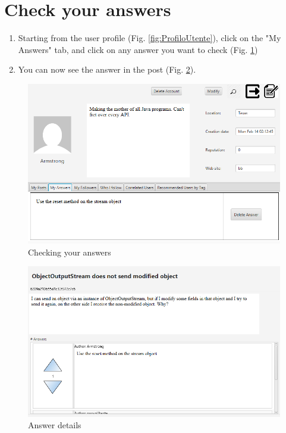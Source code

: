 \documentclass[11pt]{report}
\begin{document}
\section{Check your answers}
\begin{enumerate}
    \item Starting from the user profile (Fig. \ref{fig:ProfiloUtente}), click on the "My Answers" tab, and click on any answer you want to check (Fig. \ref{fig:ControlloRisposta1})
    \item You can now see the answer in the post (Fig. \ref{fig:ControlloRisposta2}).
\end{enumerate}
\begin{figure}[H]
  \centering
  \includegraphics[width=\textwidth,keepaspectratio=true]{img/user_manual/ControlloRisposta1.png}
  \caption{Checking your answers}
  \label{fig:ControlloRisposta1}
\end{figure}
\begin{figure}[H]
  \centering
  \includegraphics[width=\textwidth,keepaspectratio=true]{img/user_manual/ControlloRisposta2.png}
  \caption{Answer details}
  \label{fig:ControlloRisposta2}
\end{figure}
\end{document}
